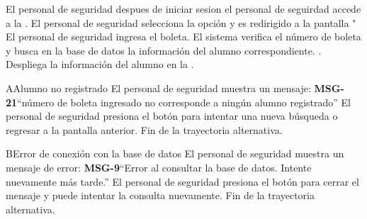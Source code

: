 \begin{UCtrayectoria}
	\UCpaso[\UCactor] El personal de seguridad despues de iniciar sesion el personal de seguirdad accede a la .
	\UCpaso[\UCactor] El personal de seguridad selecciona la opción  y es redirigido a la pantalla "
	\UCpaso[\UCactor] El personal de seguridad ingresa el boleta.
	\UCpaso El sistema verifica el número de boleta y busca en la base de datos la información del alumno correspondiente. .
	\UCpaso Despliega la información del alumno en la .
\end{UCtrayectoria}
\begin{UCtrayectoriaA}{A}{Alumno no registrado}
	\UCpaso[\UCactor] El personal de seguridad muestra un mensaje: {\bf MSG-21}{``número de boleta ingresado no corresponde a ningún alumno registrado''}
	\UCpaso[\UCactor] El personal de seguridad presiona el botón  para intentar una nueva búsqueda o regresar a la pantalla anterior.
	\UCpaso Fin de la trayectoria alternativa.
\end{UCtrayectoriaA}

\begin{UCtrayectoriaA}{B}{Error de conexión con la base de datos}
	\UCpaso[\UCactor] El personal de seguridad muestra un mensaje de error: {\bf MSG-9}{``Error al consultar la base de datos. Intente nuevamente más tarde.''}
	\UCpaso[\UCactor] El personal de seguridad presiona el botón  para cerrar el mensaje y puede intentar la consulta nuevamente.
	\UCpaso Fin de la trayectoria alternativa.
\end{UCtrayectoriaA}

